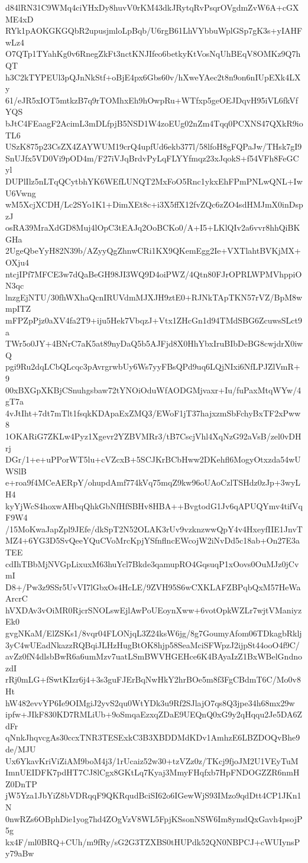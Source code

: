 d84lRN31C9WMq4ciYHxDy8huvV0rKM43dkJRytqRvPsqrOVgdmZvW6A+cGXME4xD
RYk1pAOKGKGQbR2upusjmloLpBqb/U6rgB61LhVYbbuWplGSp7gK3s+yIAHFwLz4
O7QTp1TYahKg0v6RnegZkFt3nctKNJIfeo6betkyKtVosNqUhBEqV8OMKz9Q7hQT
h3C2kTYPEUl3pQJnNkStf+oBjE4px6Gbs60v/hXweYAec2t8n9on6nIUpEXk4LXy
61/eJR5xIOT5mtkzB7q9rTOMhxEh9hOwpRu+WTfxp5geOEJDqvH95iVL6fkVfYQS
bJtC4FEaagF2AcimL3mDLfpjB5NSD1W4zoEUg02nZm4Tqq0PCXNS47QXkR9ioTL6
USzK875p23CsZX4ZAYWUM19crQ4upfUd6ekb377l/58lfoH8gFQPaJw/THsk7gI9
SnUJfx5VD0Vi9pOD4m/F27iVJqBrdvPyLqFLYYfmqz23xJqokS+f54VFh8FeGCyl
DUPlIlz5nLTqQCytbhYK6WEfLUNQT2MxFoO5Rnc1ykxEhFPmPNLwQNL+IwU6Vwng
wM5XcjXCDH/Lc2SYo1K1+DimXEt8c+i3X5ffX12fvZQc6zZO4sdHMJmX0inDspzJ
osRA39MraXdGD8Muj4lOpC3tEAJq2OoBCKo0/A+I5+LKlQIv2a6vvr8hhQiBKGHa
2UgeQbeYyH82N39b/AZyyQgZhnwCRi1KX9QKemEgg2Ie+VXTlahtBVKjMX+OXju4
ntcjIPf7MFCE3w7dQaBeGH98JI3WQ9D4oiPWZ/4Qtn80FJrOPRLWPMVhppiON3qc
lnzgEjNTU/30fhWXhaQcnIRUVdmMJXJH9ztE0+RJNkTApTKN57rVZ/BpM8wmpITZ
mFPZpPjz0aXV4fa2T9+iju5Hek7VbqzJ+Vtx1ZHcGn1d94TMdSBG6ZcuwsSLct9a
TWr5o0JY+4BNrC7aK5at89nyDaQ5b5AJFjd8X0HhYbxIruBIbDeBG8cwjdrX0iwQ
pgi9Ru2dqLCbQLcqc3pAvrgrwbUy6Ws7yyFBsQPd9uq6LQjNIxi6NfLPJZlVmR+9
00xBXGpXKBjCSnuhgsbaw72tYNOiOduWfAODGMjvaxr+Iu/fuPaxMtqWYw/4gT7a
4vJtIht+7dt7mTlt1fsqkKDApaExZMQ3/EWoF1jT37hajxzmSbFchyBxTF2xPww8
1OKARiG7ZKLw4Pyz1Xgevr2YZBVMRr3/tB7CscjVhl4XqNzG92aVsB/zel0vDHrj
DGr/1+e+uPPorWT5lu+cVZcxB+5SCJKrBCbHww2DKehfl6MogyOtxzda54wUWSlB
e+roa9f4MCeAERpY/ohupdAmf774kVq75mqZ9kw96oUAoCzlTSHdz0zJp+3wyLH4
kyYjWcS4hoxwAHbqQhkGbNfHfSBHv8HBA++BvgtodG1Jv6qAPUQYmv4tifVqF9W4
/15MoKwaJapZpl9JEfe/dkSpT2N52OLAK3rUv9vzknzwwQpY4v4HxeyfIIE1JnvT
MZ4+6YG3D5SvQeeYQuCVoMrcKpjYSfnflncEWcojW2iNvDd5c18ab+On27E3aTEE
cdIhTBbMjNVGpLixuxM63huYcl7Bkde3qamupRO4GqsuqP1xOovs0OuMJz0jCvmI
D8+/Pw3z9SSr5UvVI7lGbxOs4HcLE/9ZVH95S6wCXKLAFZBPqbQxM57HeWaArcrC
hVXDAv3vOiMR0RjcrSNOLswEjlAwPoUEoynXww+6votOpkWZLr7wjtVManiyzEk0
gvgNKaM/ElZSKs1/8vqr04FLONjqL3Z24ksW6jg/8g7GoumyAfom06TDkagbRklj
3yC4wUEadNkazzRQBqiJLHzHugBtOK8hjp58SeaMciSFWpzJ2ijpSt44ooO4f9C/
avZz0fN4dlsbBwR6a6umMzv7uatLSmBWVHGEHce6K4BAyaIzZ1BxWBelGndnozdI
rRj0mLG+fSwtKIzr6j4+3s3guFJErBqNwHkY2hrBOe5m8f3FgCBdmT6C/Mo0v8Ht
hW482evvYP6Ie9OIMgiJ2yvS2qu0WtYDk3u9Rf2SJlajO7qs8Q3jpe34h68mx29w
ipfw+JIkF830KD7RMLiUb+9oSmqaEzxqZDaE9UEQnQ0xG9y2qHqqu2Je5DA6ZdFr
qNnkJhqvcgAs30ccxTNR3TESExkC3B3XBDDMdKDv1AmhzE6LBZDOQvBhe9de/MJU
Ux6YkavKriViZiAM9boM4j3/1rUcaiz52w30+tzVZz0z/TKcj9fjoJM2U1VEyTuM
ImnUEIDFK7pdHT7CJ8lCgx8GKtLq7Kyaj3MmyFHqfxb7HpFNDOGZZR6nmHZ0DnTP
jW5Yza1JbYiZ8bVDRqqF9QKRqudBciSI62o6IGewWjS93IMzo9qdDtt4CP1JKn1N
0nwRZs6OBphDie1yog7hd4ZOgVzV8WL5FpjKSsonNSW6Im8ymdQxGavh4psojP5g
kx4F/ml0BRQ+CUh/m9fRy/sG2G3TZXBS0tHUPdk52QN0NBPCJ+cWUIynsPy79aBw
